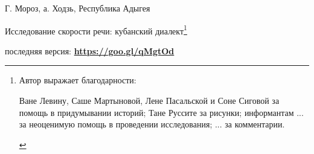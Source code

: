 
\usepackage{alltt}

\begin{flushright}
	{\footnotesize Г. Мороз, а. Ходзь, Республика Адыгея}
\end{flushright}
\begin{center}{\Large Исследование скорости речи: кубанский диалект\footnote{Автор выражает благодарности:
\begin{itemize}
\mytem Ване Левину, Саше Мартыновой, Лене Пасальской и Соне Сиговой за помощь в придумывании историй;
\mytem Тане Руссите за рисунки;
\mytem информантам ... за неоценимую помощь в проведении исследования;
\mytem ... за комментарии.
\end{itemize}}}
\end{center}
{\noindent\footnotesize последняя версия: \textbf{\href{https://goo.gl/qMgtOd}{https://goo.gl/qMgtOd}}}
\vspace{5mm}
\tableofcontents
\vfill
{~}\\
\pagebreak
